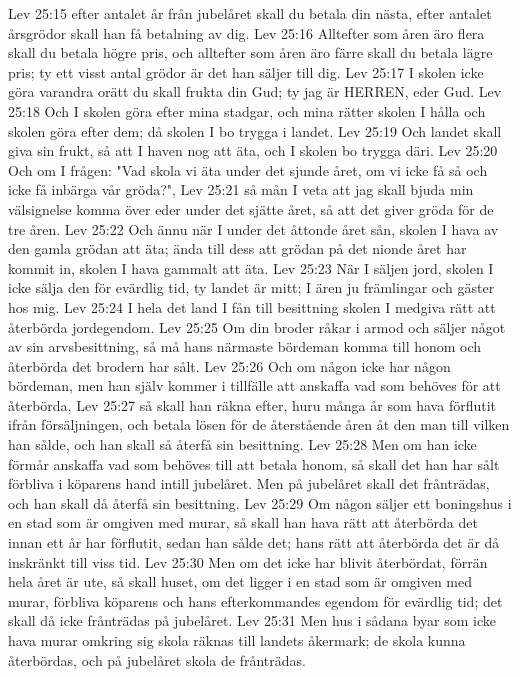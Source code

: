 Lev 25:15  efter antalet år från jubelåret skall du betala din nästa, efter antalet årsgrödor skall han få betalning av dig.
Lev 25:16  Alltefter som åren äro flera skall du betala högre pris, och alltefter som åren äro färre skall du betala lägre pris; ty ett visst antal grödor är det han säljer till dig.
Lev 25:17  I skolen icke göra varandra orätt du skall frukta din Gud; ty jag är HERREN, eder Gud.
Lev 25:18  Och I skolen göra efter mina stadgar, och mina rätter skolen I hålla och skolen göra efter dem; då skolen I bo trygga i landet.
Lev 25:19  Och landet skall giva sin frukt, så att I haven nog att äta, och I skolen bo trygga däri.
Lev 25:20  Och om I frågen: "Vad skola vi äta under det sjunde året, om vi icke få så och icke få inbärga vår gröda?",
Lev 25:21  så mån I veta att jag skall bjuda min välsignelse komma över eder under det sjätte året, så att det giver gröda för de tre åren.
Lev 25:22  Och ännu när I under det åttonde året sån, skolen I hava av den gamla grödan att äta; ända till dess att grödan på det nionde året har kommit in, skolen I hava gammalt att äta.
Lev 25:23  När I säljen jord, skolen I icke sälja den för evärdlig tid, ty landet är mitt; I ären ju främlingar och gäster hos mig.
Lev 25:24  I hela det land I fån till besittning skolen I medgiva rätt att återbörda jordegendom.
Lev 25:25  Om din broder råkar i armod och säljer något av sin arvsbesittning, så må hans närmaste bördeman komma till honom och återbörda det brodern har sålt.
Lev 25:26  Och om någon icke har någon bördeman, men han själv kommer i tillfälle att anskaffa vad som behöves för att återbörda,
Lev 25:27  så skall han räkna efter, huru många år som hava förflutit ifrån försäljningen, och betala lösen för de återstående åren åt den man till vilken han sålde, och han skall så återfå sin besittning.
Lev 25:28  Men om han icke förmår anskaffa vad som behöves till att betala honom, så skall det han har sålt förbliva i köparens hand intill jubelåret. Men på jubelåret skall det frånträdas, och han skall då återfå sin besittning.
Lev 25:29  Om någon säljer ett boningshus i en stad som är omgiven med murar, så skall han hava rätt att återbörda det innan ett år har förflutit, sedan han sålde det; hans rätt att återbörda det är då inskränkt till viss tid.
Lev 25:30  Men om det icke har blivit återbördat, förrän hela året är ute, så skall huset, om det ligger i en stad som är omgiven med murar, förbliva köparens och hans efterkommandes egendom för evärdlig tid; det skall då icke frånträdas på jubelåret.
Lev 25:31  Men hus i sådana byar som icke hava murar omkring sig skola räknas till landets åkermark; de skola kunna återbördas, och på jubelåret skola de frånträdas.

